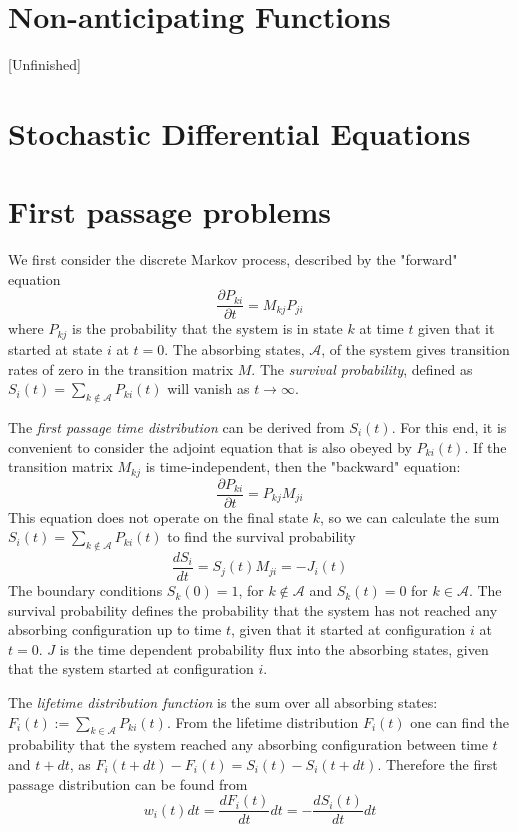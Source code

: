 \documentclass[12pt]{book}
\begin{document}
\section{Non-anticipating Functions}{[Unfinished]}
\section{Stochastic Differential Equations}
\section{First passage problems}\label{section_firstPassageProblems}
We first consider the discrete Markov process, described by the "forward" equation
\begin{equation*}
\frac{\partial P_{ki}}{\partial t}=M_{kj}P_{ji}
\end{equation*}
where $P_{kj}$ is the probability that the system is in state $k$ at time $t$ given that it started at state $i$ at $t=0$. The absorbing states, $\mathcal{A}$, of the system gives transition rates of zero in the transition matrix $M$. The \textit{survival probability}, defined as 
$S_{i}(t)=\sum_{k\notin\mathcal{A}}P_{ki}(t)$ will vanish as $t\rightarrow\infty$.

The \textit{first passage time distribution} can be derived from $S_i(t)$. For this end, it is convenient to consider the adjoint equation that is also obeyed by $P_{ki}(t)$. If the transition matrix $M_{kj}$ is time-independent, then the "backward" equation:
\begin{equation*}
\frac{\partial P_{ki}}{\partial t}=P_{kj}M_{ji}
\end{equation*}
This equation does not operate on the final state $k$, so we can calculate the sum $S_{i}(t)=\sum_{k\notin\mathcal{A}}P_{ki}(t)$ to find the survival probability 
\begin{equation*}
\frac{d S_i}{dt}=S_j(t)M_{ji}=-J_i(t)
\end{equation*}
The boundary conditions $S_k(0) = 1$, for $k\notin\mathcal{A}$ and $S_k(t)=0$ for $k\in\mathcal{A}$. The survival probability defines the probability that the system has not reached any absorbing configuration up to time $t$, given that it started at configuration $i$ at $t=0$. $J$ is the time dependent probability flux into the absorbing states, given that the system started at configuration $i$. 

The \textit{lifetime distribution function} is the sum over all absorbing states: $F_i(t):=\sum_{k\in\mathcal{A}}P_{ki}(t)$. From the lifetime distribution $F_i(t)$ one can find the probability that the system reached any absorbing configuration between time $t$ and $t+ dt$, as $F_i(t+dt)-F_i(t)=S_i(t)-S_i(t+dt)$. Therefore the first passage distribution can be found from 
\begin{equation*}
w_i(t)dt=\frac{dF_i(t)}{dt}dt =-\frac{dS_i(t)}{dt}dt
\end{equation*}
\end{document}
